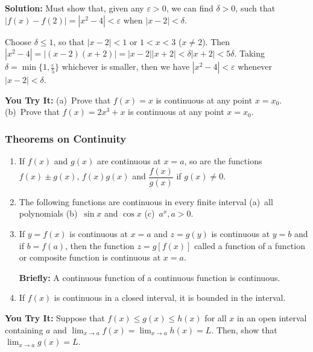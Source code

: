 \documentclass[titlepage,a4paper,12pt]{report}
\begin{document}
 \noindent \textbf{Solution:} Must show that, given any $\varepsilon >0$, we can find $\delta>0$, such that $|f(x)-f(2)|=|x^2-4|<\varepsilon$ when $|x-2|<\delta$.
 
 \noindent Choose $\delta \leq 1$, so that $|x-2|<1$ or $1<x<3$ ($x\neq 2$). Then $|x^2-4|=|(x-2)(x+2)|=|x-2||x+2| <\delta|x+2|<5\delta$. Taking $\delta =\min \{1, \frac{\varepsilon}{5}\}$ whichever is smaller, then we have $|x^2-4|<\varepsilon$ whenever $|x-2|<\delta$.
 
 
 \noindent \textbf{You Try It:} (a)\, Prove that $f(x)=x$ is continuous at any point $x=x_0$.\\
 (b)\, Prove that $f(x)=2x^3+x$ is continuous at any point $x=x_0$.
 \subsubsection{Theorems on Continuity}
 \begin{enumerate}
 \item[Theorem $1$.] If $f(x)$ and $g(x)$ are continuous at $x=a$, so are the functions $f(x) \pm g(x), \, f(x)g(x)$ and $\dfrac{f(x)}{g(x)}$ if $g(x) \neq 0$.
 \item[Theorem $2$.] The following functions are continuous in every finite interval (a)\, all polynomials \quad (b)\, $\sin x$ and $\cos x$ \quad (c)\, $a^x, a>0$.
 \item[Theorem $3$.] If $y=f(x)$ is continuous at $x=a$ and $z=g(y)$ is continuous at $y=b$ and if $b=f(a)$, then the function $z=g[f(x)]$ called a function of a function or composite function is continuous at $x=a$.
 
 \textbf{Briefly:} A continuous function of a continuous function is continuous. 
 \item[Theorem $4$.] If $f(x)$ is continuous in a closed interval, it is bounded in the interval.
\end{enumerate} 
\noindent \textbf{You Try It:} Suppose that $f(x)\leq g(x)\leq h(x)$ for all $x$ in an open interval containing  $a$ and $\displaystyle \lim _{x\rightarrow a}f(x)=\lim _{x\rightarrow a}h(x)=L$. Then, show that $\displaystyle \lim _{x\rightarrow a}g(x)=L$.
\end{document}
